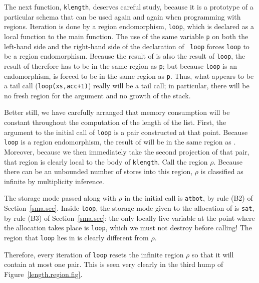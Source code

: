 \documentclass[12pt]{book}
\begin{document}
The next function, {\tt klength}, deserves careful study, because it
is a prototype of a particular schema that can be used again and again
when programming with regions. Iteration is done by a
%
region endomorphism, {\tt loop}, which is declared as a local function
to the main function. The use of the same variable {\tt p} on both the
left-hand side and the right-hand side of the declaration of {\tt
  loop} forces {\tt loop} to be a region endomorphism. Because the
result of  is also the result of {\tt loop}, the
result of  therefore has to be in the same
region as {\tt p}; but because {\tt loop} is an endomorphism,
 is forced to be in the same region as {\tt p}.
Thus, what appears to be a tail call ({\tt loop(xs,acc+1)}) really
will be a tail call; in particular, there will be no fresh region for
the argument and no growth of the stack.

Better still, we have carefully arranged that memory consumption will
be constant throughout the computation of the length of the list.
First, the argument to the initial call of {\tt loop} is a pair
 constructed at that point. Because {\tt loop} is a
region endomorphism, the result of  will be in the
same region as .  Moreover, because we then immediately
take the second projection of that pair, that region is clearly local
to the body of {\tt klength}.  Call the region $\rho$. Because there
can be an unbounded number of stores into this region, $\rho$ is
classified as infinite by multiplicity inference.

The storage mode passed along with $\rho$ in the initial call
 is {\tt atbot}, by rule (B2) of
Section~\ref{sma.sec}. Inside {\tt loop}, the storage mode given to
the allocation of  is {\tt sat}, by rule (B3) of
Section~\ref{sma.sec}: the only locally live variable at the point
where the allocation takes place is {\tt loop}, which we must not
destroy before calling! The region that {\tt loop} lies in is clearly
different from $\rho$.

Therefore, every iteration of {\tt loop} resets the infinite region
$\rho$ so that it will contain at most one pair.  This is seen very
clearly in the third hump of Figure~\ref{length.region.fig}.
\end{document}
